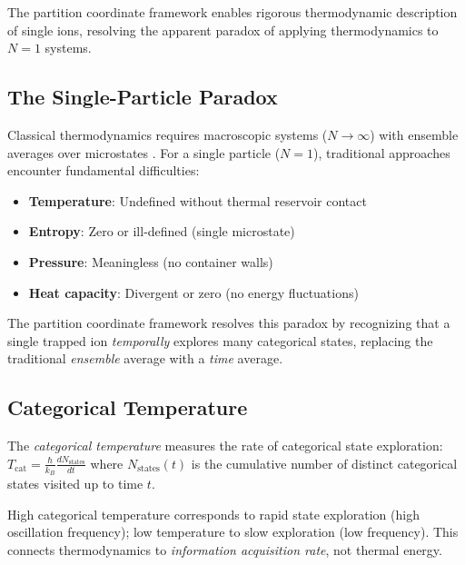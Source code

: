 The partition coordinate framework enables rigorous thermodynamic description of single ions, resolving the apparent paradox of applying thermodynamics to $N=1$ systems.

\subsection{The Single-Particle Paradox}

Classical thermodynamics requires macroscopic systems ($N \to \infty$) with ensemble averages over microstates \citep{landau1980statistical,gibbs1902elementary}. For a single particle ($N = 1$), traditional approaches encounter fundamental difficulties:
\begin{itemize}
    \item \textbf{Temperature}: Undefined without thermal reservoir contact
    \item \textbf{Entropy}: Zero or ill-defined (single microstate)
    \item \textbf{Pressure}: Meaningless (no container walls)
    \item \textbf{Heat capacity}: Divergent or zero (no energy fluctuations)
\end{itemize}

The partition coordinate framework resolves this paradox by recognizing that a single trapped ion \emph{temporally} explores many categorical states, replacing the traditional \emph{ensemble} average with a \emph{time} average.

\subsection{Categorical Temperature}

\begin{definition}
\label{def:cattemp}
The \emph{categorical temperature} measures the rate of categorical state exploration:
$
T_{\mathrm{cat}} = \frac{\hbar}{k_B} \frac{dN_{\mathrm{states}}}{dt}
$
where $N_{\mathrm{states}}(t)$ is the cumulative number of distinct categorical states visited up to time $t$.
\end{definition}

\begin{remark}
High categorical temperature corresponds to rapid state exploration (high oscillation frequency); low temperature to slow exploration (low frequency). This connects thermodynamics to \emph{information acquisition rate}, not thermal energy.
\end{remark}

